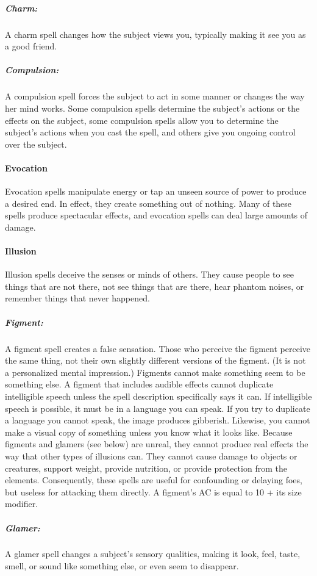\subparagraph{Charm:}
A charm spell changes how the subject views you, typically making it see you as a good friend.

\subparagraph{Compulsion:}
A compulsion spell forces the subject to act in some manner or changes the way her mind works. 
Some compulsion spells determine the subject's actions or the effects on the subject, some compulsion spells allow you to determine the subject's actions when you cast the spell, and others give you ongoing control over the subject.
\paragraph{Evocation}
Evocation spells manipulate energy or tap an unseen source of power to produce a desired end. 
In effect, they create something out of nothing. 
Many of these spells produce spectacular effects, and evocation spells can deal large amounts of damage.
\paragraph{Illusion}
Illusion spells deceive the senses or minds of others. 
They cause people to see things that are not there, not see things that are there, hear phantom noises, or remember things that never happened.

\subparagraph{Figment:}
A figment spell creates a false sensation. Those who perceive the figment perceive the same thing, not their own slightly different versions of the figment. (It is not a personalized mental impression.) 
Figments cannot make something seem to be something else. 
A figment that includes audible effects cannot duplicate intelligible speech unless the spell description specifically says it can. 
If intelligible speech is possible, it must be in a language you can speak. 
If you try to duplicate a language you cannot speak, the image produces gibberish. 
Likewise, you cannot make a visual copy of something unless you know what it looks like.
Because figments and glamers (see below) are unreal, they cannot produce real effects the way that other types of illusions can. 
They cannot cause damage to objects or creatures, support weight, provide nutrition, or provide protection from the elements. 
Consequently, these spells are useful for confounding or delaying foes, but useless for attacking them directly.
A figment's AC is equal to 10 + its size modifier.

\subparagraph{Glamer:}
A glamer spell changes a subject's sensory qualities, making it look, feel, taste, smell, or sound like something else, or even seem to disappear.

